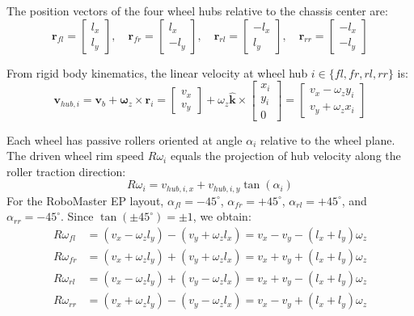 \documentclass[11pt,a4paper]{article}
\begin{document}
The position vectors of the four wheel hubs relative to the chassis center are:
\begin{equation}
    \mathbf{r}_{fl} = \begin{bmatrix} l_x \\ l_y \end{bmatrix}, \quad
    \mathbf{r}_{fr} = \begin{bmatrix} l_x \\ -l_y \end{bmatrix}, \quad
    \mathbf{r}_{rl} = \begin{bmatrix} -l_x \\ l_y \end{bmatrix}, \quad
    \mathbf{r}_{rr} = \begin{bmatrix} -l_x \\ -l_y \end{bmatrix}
\end{equation}

From rigid body kinematics, the linear velocity at wheel hub $i \in \{fl, fr, rl, rr\}$ is:
\begin{equation}
    \mathbf{v}_{hub, i} = \mathbf{v}_b + \boldsymbol{\omega}_z \times \mathbf{r}_i = 
    \begin{bmatrix} v_x \\ v_y \end{bmatrix} + \omega_z \hat{\mathbf{k}} \times \begin{bmatrix} x_i \\ y_i \\ 0 \end{bmatrix} =
    \begin{bmatrix} v_x - \omega_z y_i \\ v_y + \omega_z x_i \end{bmatrix}
\end{equation}

Each wheel has passive rollers oriented at angle $\alpha_i$ relative to the wheel plane. The driven wheel rim speed $R \omega_i$ equals the projection of hub velocity along the roller traction direction:
\begin{equation}
    R \omega_i = v_{hub, i, x} + v_{hub, i, y} \tan(\alpha_i)
\end{equation}
For the RoboMaster EP layout, $\alpha_{fl} = -45^\circ$, $\alpha_{fr} = +45^\circ$, $\alpha_{rl} = +45^\circ$, and $\alpha_{rr} = -45^\circ$. Since $\tan(\pm 45^\circ) = \pm 1$, we obtain:
\begin{align}
    R \omega_{fl} &= (v_x - \omega_z l_y) - (v_y + \omega_z l_x) = v_x - v_y - (l_x + l_y)\omega_z \\
    R \omega_{fr} &= (v_x + \omega_z l_y) + (v_y + \omega_z l_x) = v_x + v_y + (l_x + l_y)\omega_z \\
    R \omega_{rl} &= (v_x - \omega_z l_y) + (v_y - \omega_z l_x) = v_x + v_y - (l_x + l_y)\omega_z \\
    R \omega_{rr} &= (v_x + \omega_z l_y) - (v_y - \omega_z l_x) = v_x - v_y + (l_x + l_y)\omega_z
\end{align}
\end{document}
